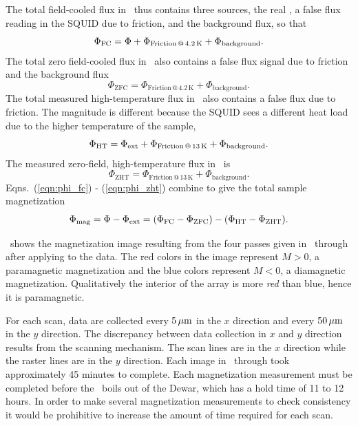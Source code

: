 The total field-cooled flux in \
thus
contains three sources, the real \Phitot, a false flux reading
in the SQUID due to friction,
and the background flux, so that
%
\begin{equation}
\Phi_\mathrm{FC} = \Phi + \Phi_\mathrm{Friction\,@\,4.2\,K}
 + \Phi_\mathrm{background}.
\label{eqn:phi_fc}
\end{equation}
%
The total zero field-cooled flux in \ 
also contains a false flux signal due to friction and the background flux
%
\begin{equation}
\Phi_\mathrm{ZFC} =  \Phi_\mathrm{Friction\,@\,4.2\,K}
 + \Phi_\mathrm{background}.
\end{equation}
%
The total measured high-temperature flux in 
\ also contains a false flux due to 
friction. The magnitude 
is different because the SQUID sees a different heat load
due to the higher temperature of the sample,
%
\begin{equation}
\Phi_\mathrm{HT} = \Phi_{\mathrm{ext}}  + \Phi_\mathrm{Friction\,@\,13\,K}
 + \Phi_\mathrm{background}.
\end{equation}
%
The measured zero-field, high-temperature flux in 
\ is
%
\begin{equation}
\Phi_\mathrm{ZHT} =  \Phi_\mathrm{Friction\,@\,13\,K}
 + \Phi_\mathrm{background}.
\label{eqn:phi_zht}
\end{equation}
%
Eqns.~(\ref{eqn:phi_fc}) - (\ref{eqn:phi_zht}) 
combine to give the total sample magnetization
\begin{equation}
\Phi_{\mathrm{mag}} = \Phi - \Phi_{\mathrm{ext}} = (\Phi_\mathrm{FC} - \Phi_\mathrm{ZFC})-
                              (\Phi_\mathrm{HT} - \Phi_\mathrm{ZHT}).
\label{eqn:mag_correction}
\end{equation}

\
shows the magnetization image resulting from the four passes
given in \ through
 after applying 
\EqnRef{eqn:mag_correction} to the data. The red colors in the image
represent $M>0$, a paramagnetic magnetization and the blue colors 
represent $M<0$, a diamagnetic magnetization. Qualitatively 
the interior of the array
is more \emph{red} than blue, hence it is paramagnetic. 

For each scan, data are collected every $5\,\mu\mathrm{m}$ in the $x$ direction
and every $50\,\mu\mathrm{m}$ in the $y$ direction. The discrepancy between 
data collection in $x$ and $y$ direction results from the scanning
mechanism. The scan lines are in the $x$ direction while the raster
lines are in the $y$ direction. Each image in 
\FigRef{fig:pme_scanning_passes_a}\
through 
took approximately 45 minutes to complete. 
Each magnetization measurement must be completed before
the \lhe\ boils out of the Dewar, which has a hold time of 11 to 12 hours.
In order to make several magnetization measurements to check consistency
it would be prohibitive to increase the amount of time required for each
scan. 

